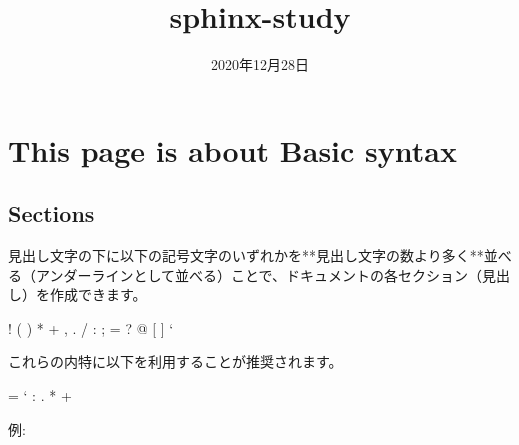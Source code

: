 \documentclass[letterpaper,10pt,dvipdfmx,openany,oneside]{sphinxmanual}
\title{sphinx-study}
\date{2020年12月28日}
\author{}
\begin{document}
\maketitle
\sphinxtableofcontents
{}\label{\detokenize{index::doc}}



\chapter{This page is about Basic syntax}
\label{\detokenize{1.chapter/basic_syntax:this-page-is-about-basic-syntax}}\label{\detokenize{1.chapter/basic_syntax:sphinx-sample-project}}\label{\detokenize{1.chapter/basic_syntax::doc}}

\section{Sections}
\label{\detokenize{1.chapter/basic_syntax:sections}}
見出し文字の下に以下の記号文字のいずれかを**見出し文字の数より多く**並べる（アンダーラインとして並べる）ことで、ドキュメントの各セクション（見出し）を作成できます。

%
\begin{sphinxVerbatim}[commandchars=\\\{\}]
! \PYGZdq{} \PYGZsh{} \PYGZdl{} \PYGZpc{} \PYGZam{} \PYGZsq{} ( ) * + , \PYGZhy{} . / : ; \PYGZlt{} = \PYGZgt{} ? @ [ \PYGZbs{} ] \PYGZca{} \PYGZus{} {}` \PYGZob{} \textbar{} \PYGZcb{} \PYGZti{}
\end{sphinxVerbatim}

これらの内特に以下を利用することが推奨されます。

%
\begin{sphinxVerbatim}[commandchars=\\\{\}]
= \PYGZhy{} {}` : . \PYGZsq{} \PYGZdq{} \PYGZti{} \PYGZca{} \PYGZus{} * + \PYGZsh{}
\end{sphinxVerbatim}

例:

%
\begin{sphinxVerbatim}[commandchars=\\\{\}]





\end{sphinxVerbatim}
\end{document}
